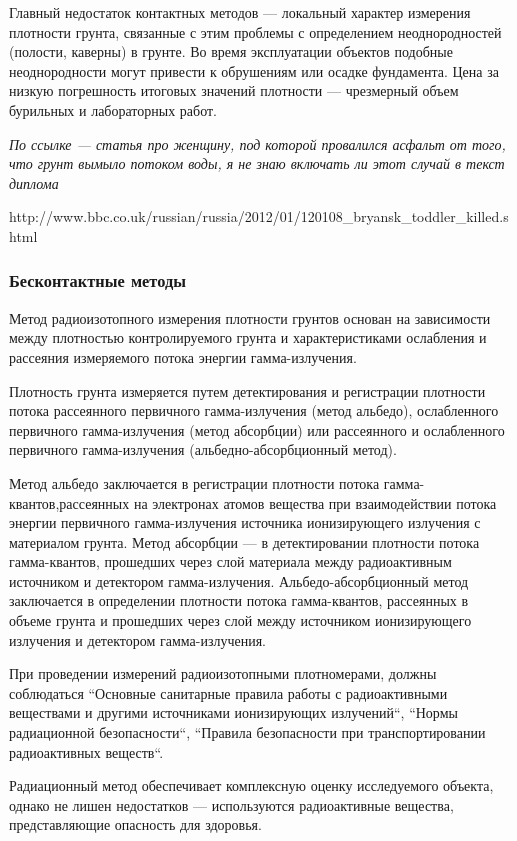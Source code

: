 \documentclass[a4paper,10pt]{article}
\begin{document}
Главный недостаток контактных методов --- локальный характер измерения плотности грунта, связанные с этим проблемы с определением 
неоднородностей (полости, каверны) в грунте. Во время эксплуатации объектов подобные неоднородности могут привести к обрушениям или осадке фундамента. 
Цена за низкую погрешность итоговых значений плотности --- чрезмерный объем бурильных и лабораторных работ. 

\textit{По ссылке --- статья про женщину, под которой провалился асфальт от того, что грунт вымыло потоком воды, я не знаю включать ли этот случай в текст 
диплома} 

http://www.bbc.co.uk/russian/russia/2012/01/120108\_bryansk\_toddler\_killed.shtml

\subsubsection{Бесконтактные методы}

Метод радиоизотопного измерения плотности грунтов основан на зависимости между плотностью контролируемого 
грунта и характеристиками ослабления и рассеяния измеряемого потока энергии гамма-излучения.

Плотность грунта измеряется путем детектирования и регистрации плотности потока рассеянного первичного 
гамма-излучения (метод альбедо), ослабленного первичного гамма-излучения (метод абсорбции) или 
рассеянного и ослабленного первичного гамма-излучения (альбедно-абсорбционный метод).

Метод альбедо заключается в регистрации плотности потока гамма-квантов,рассеянных на электронах атомов 
вещества при взаимодействии потока энергии первичного гамма-излучения источника ионизирующего излучения с материалом грунта.
Метод абсорбции --- в детектировании плотности потока гамма-квантов, прошедших через слой материала 
между радиоактивным источником и детектором гамма-излучения.
Альбедо-абсорбционный метод заключается в определении плотности потока гамма-квантов, рассеянных 
в объеме грунта и прошедших через слой между источником ионизирующего излучения и детектором гамма-излучения.

При проведении измерений радиоизотопными плотномерами, должны соблюдаться ``Основные санитарные правила работы с 
радиоактивными веществами и другими источниками ионизирующих излучений``, ``Нормы радиационной безопасности``, 
``Правила безопасности при транспортировании радиоактивных веществ``.

Радиационный метод обеспечивает комплексную оценку исследуемого объекта, однако не лишен недостатков --- используются
радиоактивные вещества, представляющие опасность для здоровья.
\end{document}
